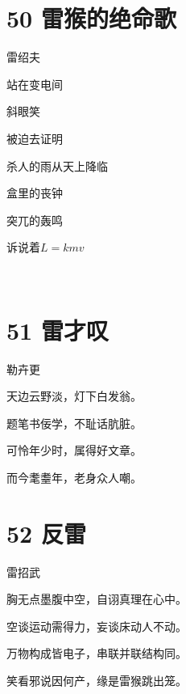 \documentclass[UTF8,12pt,oneside]{ctexbook}
\begin{document}
        \newpage
        
        \section{50 雷猴的绝命歌}
        \begin{center}
            雷绍夫
        \end{center}
        
        \begin{center}
            站在变电间
            
            斜眼笑
            
            被迫去证明
            
            杀人的雨从天上降临
            
            盒里的丧钟
            
            突兀的轰鸣
            
            诉说着$L=kmv$
            
            ~\\
        \end{center}
        
        \section{51 雷才叹}
        \begin{center}
            勒卉更
        \end{center}
        
        \begin{center}
            天边云野淡，灯下白发翁。
            
            题笔书佞学，不耻话肮脏。
            
            可怜年少时，属得好文章。
            
            而今耄耋年，老身众人嘲。
        \end{center}
        
        \newpage
        
        \section{52 反雷}
        \begin{center}
            雷招武
        \end{center}
        
        \begin{center}
            胸无点墨腹中空，自诩真理在心中。
        
            空谈运动需得力，妄谈床动人不动。
        
            万物构成皆电子，串联并联结构同。
        
            笑看邪说因何产，缘是雷猴跳出笼。
        \end{center}
        
\end{document}
